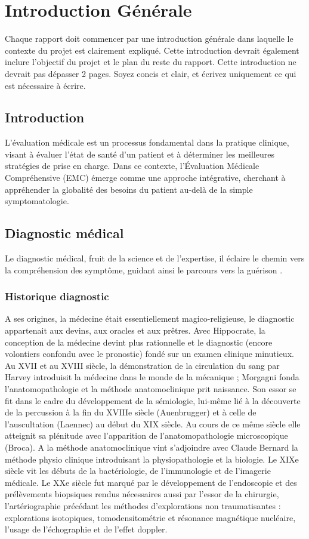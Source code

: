 \chapter{Introduction Générale}
Chaque rapport doit commencer par une introduction générale dans laquelle le contexte du projet est clairement expliqué. Cette introduction devrait également inclure l'objectif du projet et le plan du reste du rapport. Cette introduction ne devrait pas dépasser 2 pages. Soyez concis et clair, et écrivez uniquement ce qui est nécessaire à écrire.

\section{Introduction }
L'évaluation médicale est un processus fondamental dans la pratique clinique, visant à évaluer l'état de santé d'un patient et à déterminer les meilleures stratégies de prise en charge.
 Dans ce contexte, l'Évaluation Médicale Compréhensive (EMC) émerge comme une approche intégrative, cherchant à appréhender la globalité des besoins du patient au-delà de la simple symptomatologie.

\section{Diagnostic médical }
Le diagnostic médical, fruit de la science et de l'expertise, il éclaire le chemin vers la compréhension des symptôme, guidant ainsi le parcours vers la guérison .
\newpage
\subsection{Historique diagnostic }
A ses origines, la médecine était essentiellement magico-religieuse, le diagnostic appartenait aux devins, aux oracles et aux prêtres. Avec Hippocrate, la conception de la médecine devint plus rationnelle et le diagnostic (encore volontiers confondu avec le pronostic) fondé sur un examen clinique minutieux.
Au XVII et au XVIII siècle, la démonstration de la circulation du sang par Harvey introduisit la médecine dans le monde de la mécanique ; Morgagni fonda l’anatomopathologie et la méthode anatomoclinique prit naissance. Son essor se fit dans le cadre du développement de la sémiologie, lui-même lié à la découverte de la percussion à la fin du XVIIIe siècle (Auenbrugger) et à celle de l’auscultation (Laennec) au début du XIX siècle.
Au cours de ce même siècle elle atteignit sa plénitude avec l’apparition de l’anatomopathologie microscopique (Broca). 
A la méthode anatomoclinique vint s’adjoindre avec Claude
Bernard la méthode physio clinique introduisant la physiopathologie et la biologie. Le XIXe siècle vit les débuts de la bactériologie, de l’immunologie et de l’imagerie médicale.
Le XXe siècle fut marqué par le développement de l’endoscopie et des prélèvements biopsiques rendus nécessaires aussi par l’essor de la chirurgie, l’artériographie précédant les méthodes d’explorations non traumatisantes : explorations isotopiques, tomodensitométrie et résonance magnétique nucléaire, l’usage de l’échographie et de l’effet doppler.

